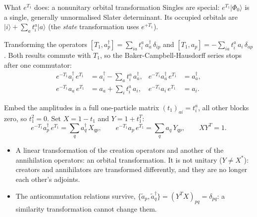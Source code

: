 \documentclass[aspectratio=169,10pt]{beamer}
\newcommand{\ket}[1]{\vert #1\rangle}
\newcommand{\cre}[1]{a_{#1}^{\dagger}}
\newcommand{\ann}[1]{a_{#1}}
\newcommand{\ph}{\Phi_0}
\begin{document}
\begin{frame}[shrink=19]{What $e^{T_1}$ does: a nonunitary orbital transformation}
\small
Singles are special: $e^{T_1}\ket{\ph}$ is a single, generally unnormalised Slater determinant. Its occupied orbitals are $\ket i+\sum_a t_i^a\ket a$ (the \emph{state} transformation uses $e^{+T_1}$).
\begin{block}{Transforming the operators}
$[T_1,\cre p]=\sum_{ia}t_i^a\,\cre a\,\delta_{ip}$ and $[T_1,\ann p]=-\sum_{ia}t_i^a\,\ann i\,\delta_{ap}$. Both results commute with $T_1$, so the Baker-Campbell-Hausdorff series stops after one commutator:
\begin{align*}
 e^{-T_1}\cre i\,e^{T_1}&=\cre i-\sum_at_i^a\,\cre a,&
 e^{-T_1}\cre a\,e^{T_1}&=\cre a,\\
 e^{-T_1}\ann a\,e^{T_1}&=\ann a+\sum_it_i^a\,\ann i,&
 e^{-T_1}\ann i\,e^{T_1}&=\ann i .
\end{align*}
\end{block}
Embed the amplitudes in a full one-particle matrix $(t_1)_{ai}=t_i^a$, all other blocks zero, so $t_1^2=0$. Set $X=1-t_1$ and $Y=1+t_1^T$:
\[
 e^{-T_1}\cre p\,e^{T_1}=\sum_q\cre q\,X_{qp},\qquad
 e^{-T_1}\ann p\,e^{T_1}=\sum_q\ann q\,Y_{qp},\qquad XY^{T}=1 .
\]
\begin{itemize}
\item A linear transformation of the creation operators and another of the annihilation operators: an orbital transformation. It is not unitary ($Y\ne X^{*}$): creators and annihilators are transformed differently, and they are no longer each other's adjoints.
\item The anticommutation relations survive, $\{\tilde a_p,\tilde a_q^\dagger\}=(Y^{T}X)_{pq}=\delta_{pq}$: a similarity transformation cannot change them.
\end{itemize}
\end{frame}
\end{document}
